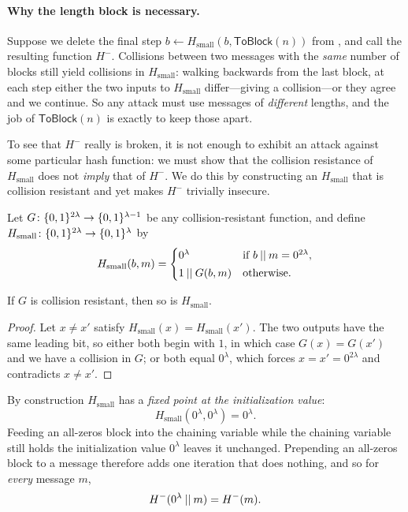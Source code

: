 \paragraph{Why the length block is necessary.}
Suppose we delete the final step $b \gets H_\text{small}(b, \mathsf{ToBlock}(n))$
from , and call the resulting function $H^-$.
Collisions between two messages with the \emph{same} number of blocks still
yield collisions in $H_\text{small}$: walking backwards from the last block,
at each step either the two inputs to $H_\text{small}$ differ---giving a
collision---or they agree and we continue.
So any attack must use messages of \emph{different} lengths, and the job of
$\mathsf{ToBlock}(n)$ is exactly to keep those apart.

To see that $H^-$ really is broken, it is not enough to exhibit an attack
against some particular hash function: we must show that the collision
resistance of $H_\text{small}$ does not \emph{imply} that of $H^-$.
We do this by constructing an $H_\text{small}$ that is collision resistant
and yet makes $H^-$ trivially insecure.

\begin{const}
  \label{const:md-no-length}
  Let $G\colon \{0,1\}^{2\lambda} \rightarrow \{0,1\}^{\lambda-1}$ be any
  collision-resistant function, and define
  $H_\text{small}\colon \{0,1\}^{2\lambda} \rightarrow \{0,1\}^{\lambda}$ by
  \[
    H_\text{small}(b, m) =
    \begin{cases}
      0^{\lambda} & \text{if } b \mathbin{||} m = 0^{2\lambda},\\[2pt]
      1 \mathbin{||} G(b, m) & \text{otherwise.}
    \end{cases}
  \]
\end{const}

\begin{claim}
  If $G$ is collision resistant, then so is $H_\text{small}$.
\end{claim}
\begin{proof}
  Let $x \neq x'$ satisfy $H_\text{small}(x) = H_\text{small}(x')$.
  The two outputs have the same leading bit, so either both begin with $1$,
  in which case $G(x) = G(x')$ and we have a collision in $G$;
  or both equal $0^{\lambda}$, which forces $x = x' = 0^{2\lambda}$ and
  contradicts $x \neq x'$.
\end{proof}

By construction $H_\text{small}$ has a \emph{fixed point at the initialization
value}:
\[
  H_\text{small}(0^{\lambda}, 0^{\lambda}) = 0^{\lambda}.
\]
Feeding an all-zeros block into the chaining variable while the chaining
variable still holds the initialization value $0^{\lambda}$ leaves it
unchanged. Prepending an all-zeros block to a message therefore adds one
iteration that does nothing, and so for \emph{every} message $m$,
\[
  H^-(0^{\lambda} \mathbin{||} m) = H^-(m).
\]


